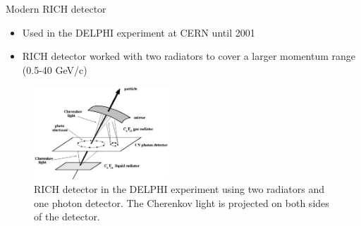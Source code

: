 \documentclass[aspectratio=1610, 10pt]{beamer}
\begin{document}

\begin{frame}{Modern RICH detector}
  \begin{itemize}
    \item Used in the DELPHI experiment at CERN until 2001
    \medskip
    \item RICH detector worked with two radiators to cover a larger momentum range (0.5-40 GeV/c)
  \end{itemize}
  \begin{figure}
    \includegraphics[width=0.45\textwidth]{images/rich_delphi.png}
    \caption{RICH detector in the DELPHI experiment using two radiators and one photon detector. The Cherenkov light is projected on both
    sides of the detector.}
  \end{figure}
\end{frame}
\end{document}
